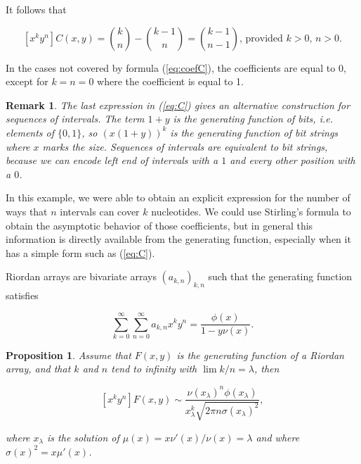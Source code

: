 \documentclass{article}
\newtheorem{proposition}{Proposition}
\newtheorem*{remark}{Remark}
\begin{document}
It follows that

\begin{equation}
\label{eq:coefC}
[x^ky^n] C(x,y) =
{k \choose n} - {k-1 \choose n} = {k-1 \choose n-1}
\text{, provided $k > 0$, $n > 0$}.
\end{equation}

In the cases not covered by formula (\ref{eq:coefC}), the coefficients are
equal to 0, except for $k = n = 0$ where the coefficient is equal to 1.

\begin{remark}
The last expression in (\ref{eq:C}) gives an alternative construction for
sequences of intervals. The term $1+y$ is the generating function of bits,
\textit{i.e.} elements of $\{0,1\}$, so $(x(1+y))^k$ is the generating
function of bit strings where $x$ marks the size. Sequences of intervals
are equivalent to bit strings, because we can encode left end of intervals
with a $1$ and every other position with a $0$.
\end{remark}

In this example, we were able to obtain an explicit expression for the
number of ways that $n$ intervals can cover $k$ nucleotides. We could use
Stirling's formula to obtain the asymptotic behavior of those
coefficients, but in general this information is directly available from
the generating function, especially when it has a simple form such as
(\ref{eq:C}).

Riordan arrays are bivariate arrays $(a_{k,n})_{k,n}$ such that the
generating function satisfies

\begin{equation*}
\sum_{k=0}^\infty \sum_{n=0}^\infty a_{k,n} x^k y^n =
\frac{\phi(x)}{1-y \nu(x)}.
\end{equation*}

\begin{proposition}
\label{th:PW}
Assume that $F(x,y)$ is the generating function of a Riordan array, and
that $k$ and $n$ tend to infinity with $\lim k/n = \lambda$, then

\begin{equation}
\label{eq:assRA}
[x^ky^n]F(x,y) \sim \frac{\nu(x_\lambda)^n\phi(x_\lambda)}
  {x_\lambda^k\sqrt{2\pi n \sigma(x_\lambda)^2}},
\end{equation}

\noindent
where $x_\lambda$ is the solution of $\mu(x) = x\nu'(x)/\nu(x) = \lambda$
and where $\sigma(x)^2 = x \mu'(x)$.
\end{proposition}
\end{document}
